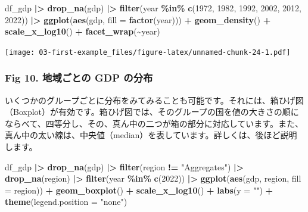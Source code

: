 \documentclass[
  xelatex, ja=standard]{bxjsbook}
\newenvironment{Shaded}{\begin{snugshade}}{\end{snugshade}}
\newcommand{\AttributeTok}[1]{\textcolor[rgb]{0.13,0.29,0.53}{#1}}
\newcommand{\DecValTok}[1]{\textcolor[rgb]{0.00,0.00,0.81}{#1}}
\newcommand{\FunctionTok}[1]{\textcolor[rgb]{0.13,0.29,0.53}{\textbf{#1}}}
\newcommand{\NormalTok}[1]{#1}
\newcommand{\SpecialCharTok}[1]{\textcolor[rgb]{0.81,0.36,0.00}{\textbf{#1}}}
\newcommand{\StringTok}[1]{\textcolor[rgb]{0.31,0.60,0.02}{#1}}
\theoremstyle{definition}
\theoremstyle{definition}
\theoremstyle{definition}
\theoremstyle{definition}
\theoremstyle{remark}
\begin{document}
\begin{Shaded}
\begin{Highlighting}[]
\NormalTok{df\_gdp }\SpecialCharTok{|\textgreater{}} \FunctionTok{drop\_na}\NormalTok{(gdp) }\SpecialCharTok{|\textgreater{}} 
  \FunctionTok{filter}\NormalTok{(year }\SpecialCharTok{\%in\%} \FunctionTok{c}\NormalTok{(}\DecValTok{1972}\NormalTok{, }\DecValTok{1982}\NormalTok{, }\DecValTok{1992}\NormalTok{, }\DecValTok{2002}\NormalTok{, }\DecValTok{2012}\NormalTok{, }\DecValTok{2022}\NormalTok{)) }\SpecialCharTok{|\textgreater{}}
  \FunctionTok{ggplot}\NormalTok{(}\FunctionTok{aes}\NormalTok{(gdp, }\AttributeTok{fill =} \FunctionTok{factor}\NormalTok{(year))) }\SpecialCharTok{+} 
  \FunctionTok{geom\_density}\NormalTok{() }\SpecialCharTok{+} \FunctionTok{scale\_x\_log10}\NormalTok{() }\SpecialCharTok{+} \FunctionTok{facet\_wrap}\NormalTok{(}\SpecialCharTok{\textasciitilde{}}\NormalTok{year)}
\end{Highlighting}
\end{Shaded}

\texttt{[image: 03-first-example\_files/figure-latex/unnamed-chunk-24-1.pdf]}

\hypertarget{fig-10.-ux5730ux57dfux3054ux3068ux306e-gdp-ux306eux5206ux5e03}{%
\subsubsection{Fig 10. 地域ごとの GDP の分布}\label{fig-10.-ux5730ux57dfux3054ux3068ux306e-gdp-ux306eux5206ux5e03}}

いくつかのグループごとに分布をみてみることも可能です。それには、箱ひげ図（Boxplot）が有効です。箱ひげ図では、そのグループの国を値の大きさの順にならべて、四等分し、その、真ん中の二つが箱の部分に対応しています。また、真ん中の太い線は、中央値（median）を表しています。詳しくは、後ほど説明します。

\begin{Shaded}
\begin{Highlighting}[]
\NormalTok{df\_gdp }\SpecialCharTok{|\textgreater{}} \FunctionTok{drop\_na}\NormalTok{(gdp) }\SpecialCharTok{|\textgreater{}} \FunctionTok{filter}\NormalTok{(region }\SpecialCharTok{!=} \StringTok{"Aggregates"}\NormalTok{) }\SpecialCharTok{|\textgreater{}}
  \FunctionTok{drop\_na}\NormalTok{(region) }\SpecialCharTok{|\textgreater{}} \FunctionTok{filter}\NormalTok{(year }\SpecialCharTok{\%in\%} \FunctionTok{c}\NormalTok{(}\DecValTok{2022}\NormalTok{)) }\SpecialCharTok{|\textgreater{}}
  \FunctionTok{ggplot}\NormalTok{(}\FunctionTok{aes}\NormalTok{(gdp, region, }\AttributeTok{fill =}\NormalTok{ region)) }\SpecialCharTok{+} 
  \FunctionTok{geom\_boxplot}\NormalTok{() }\SpecialCharTok{+} \FunctionTok{scale\_x\_log10}\NormalTok{() }\SpecialCharTok{+} \FunctionTok{labs}\NormalTok{(}\AttributeTok{y =} \StringTok{""}\NormalTok{) }\SpecialCharTok{+} 
  \FunctionTok{theme}\NormalTok{(}\AttributeTok{legend.position =} \StringTok{"none"}\NormalTok{)}
\end{Highlighting}
\end{Shaded}
\end{document}
